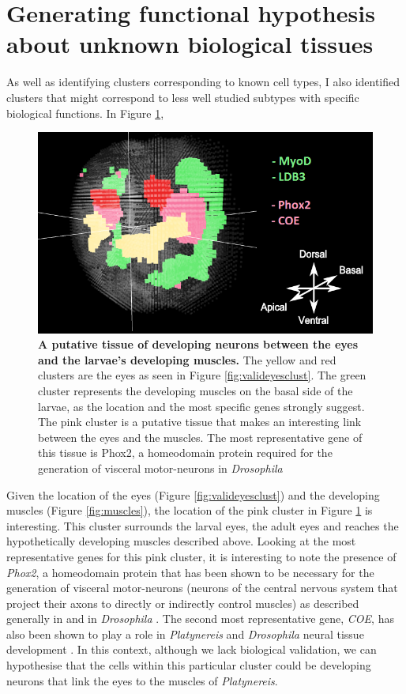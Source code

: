 	\section{Generating functional hypothesis about unknown biological tissues}
	As well as identifying clusters corresponding to known cell types, I also identified clusters that might correspond to less well studied subtypes with specific biological functions. In Figure \ref{fig:eyes_muscles}, 
	\begin{figure}[h]
\centerline{\includegraphics[width=0.8\linewidth]{gfx/chapter6/eyes_muscles.png}}
\caption{{\bf A putative tissue of developing neurons between the eyes and the larvae's developing muscles.} The yellow and red clusters are the eyes as seen in Figure \ref{fig:valideyesclust}. The green cluster represents the developing muscles on the basal side of the larvae, as the location and the most specific genes strongly suggest. The pink cluster is a putative tissue that makes an interesting link between the eyes and the muscles. The most representative gene of this tissue is Phox2, a homeodomain protein required for the generation of visceral motor-neurons in \emph{Drosophila} \cite{briscoe99}}
\label{fig:eyes_muscles}
	\end{figure}

	Given the location of the eyes (Figure \ref{fig:valideyesclust}) and the developing muscles (Figure \ref{fig:muscles}), the location of the pink cluster in Figure \ref{fig:eyes_muscles} is interesting. This cluster surrounds the larval eyes, the adult eyes and reaches the hypothetically developing muscles described above. Looking at the most representative genes for this pink cluster, it is interesting to note the presence of {\it{Phox2}}, a homeodomain protein that has been shown to be necessary for the generation of visceral motor-neurons (neurons of the central nervous system that project their axons to directly or indirectly control muscles) as described generally in \cite{brunet02} and in \emph{Drosophila} \cite{briscoe99}. The second most representative gene, {\it{COE}}, has also been shown to play a role in \emph{Platynereis} and \emph{Drosophila} neural tissue development \cite{demilly11}. In this context, although we lack biological validation, we can hypothesise that the cells within this particular cluster could be developing neurons that link the eyes to the muscles of \emph{Platynereis}.\\
	

